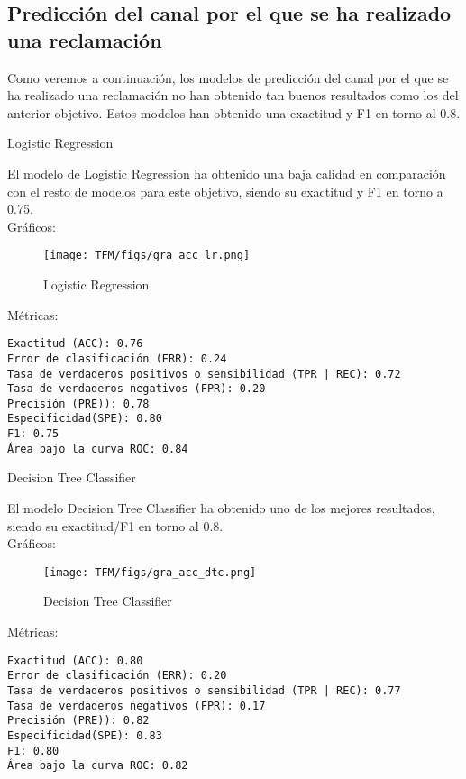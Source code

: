 \subsection{Predicción del canal por el que se ha realizado una reclamación}
Como veremos a continuación, los modelos de predicción del canal por el que se ha realizado una reclamación no han obtenido tan buenos resultados como los del anterior objetivo. Estos modelos han obtenido una exactitud y F1 en torno al 0.8.

\begin{itemize}

\begin{minipage}{\linewidth}
    \item Logistic Regression
    
El modelo de Logistic Regression ha obtenido una baja calidad en comparación con el resto de modelos para este objetivo, siendo su exactitud y F1 en torno a 0.75.
\\

Gráficos:    
\begin{figure}[H]
\centerline{\texttt{[image: TFM/figs/gra\_acc\_lr.png]}}
\caption{Logistic Regression}
\label{fig:gra_acc_lr}
\end{figure}
Métricas:
\begin{verbatim}
Exactitud (ACC): 0.76
Error de clasificación (ERR): 0.24
Tasa de verdaderos positivos o sensibilidad (TPR | REC): 0.72
Tasa de verdaderos negativos (FPR): 0.20
Precisión (PRE)): 0.78
Especificidad(SPE): 0.80
F1: 0.75
Área bajo la curva ROC: 0.84
\end{verbatim}
\end{minipage}

\begin{minipage}{\linewidth}
    \item Decision Tree Classifier
    
El modelo Decision Tree Classifier ha obtenido uno de los mejores resultados, siendo su exactitud/F1 en torno al 0.8.
\\

Gráficos:
\begin{figure}[H]
\centerline{\texttt{[image: TFM/figs/gra\_acc\_dtc.png]}}
\caption{Decision Tree Classifier}
\label{fig:gra_acc_dtc}
\end{figure}
Métricas:
\begin{verbatim}
Exactitud (ACC): 0.80
Error de clasificación (ERR): 0.20
Tasa de verdaderos positivos o sensibilidad (TPR | REC): 0.77
Tasa de verdaderos negativos (FPR): 0.17
Precisión (PRE)): 0.82
Especificidad(SPE): 0.83
F1: 0.80
Área bajo la curva ROC: 0.82
\end{verbatim}
\end{minipage}


\end{itemize}
